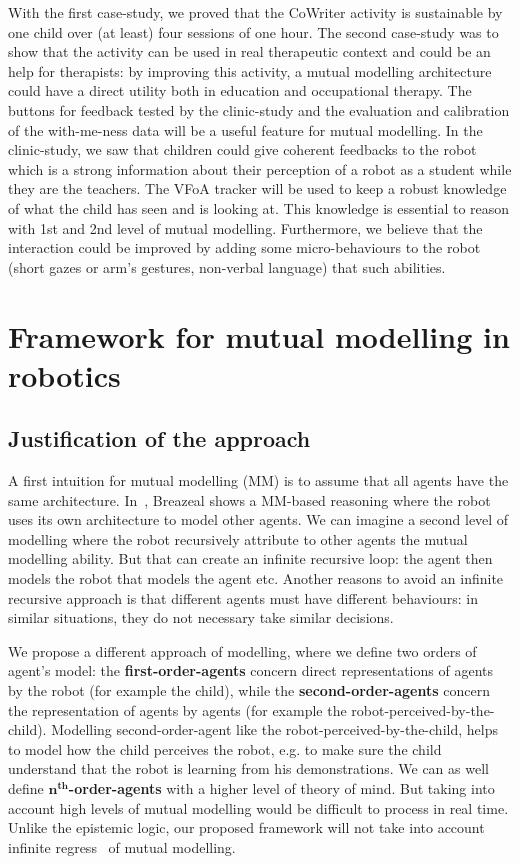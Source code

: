 \documentclass[10pt,a4paper]{article}
\begin{document}
With the first case-study, we proved that the CoWriter activity is sustainable by one child over (at least) four sessions of one hour. 
The second case-study was to show that the activity can be used in real therapeutic context and could be an help for therapists: by improving this activity, a mutual modelling architecture could have a direct utility both in education and occupational therapy. 
The buttons for feedback tested by the clinic-study and the evaluation and calibration of the with-me-ness data will be a useful feature for mutual modelling. 
In the clinic-study, we saw that children could give coherent feedbacks to the robot which is a strong information about their perception of a robot as a student while they are the teachers. 
The VFoA tracker
 will be used to keep a robust knowledge of what the child has seen and is looking at. This knowledge is essential to reason with 1st and 2nd level of mutual modelling. Furthermore, we believe that the interaction could be improved by adding some micro-behaviours to the robot (short gazes or arm's gestures, non-verbal language) that such abilities.

\section{Framework for mutual modelling in robotics}\label{framework}
\subsection{Justification of the approach}

A first intuition for mutual modelling (MM) is to assume that all agents have the same architecture. In~\cite{breazeal2006using}, Breazeal shows a MM-based reasoning where the robot uses its own architecture to model other agents. We can imagine a second level of modelling where the robot recursively attribute to other agents the mutual modelling ability. But that can create an infinite recursive loop: the agent then models the robot that models the agent etc. Another reasons to avoid an infinite recursive approach is that different agents must have different behaviours: in similar situations, they do not necessary take similar decisions. 

We propose a different approach of modelling, where we define two orders of agent's model: the \textbf{first-order-agents} concern direct representations of agents by the robot (for example the child), while the \textbf{second-order-agents} concern the representation of agents by agents (for example the robot-perceived-by-the-child). 
Modelling second-order-agent like the robot-perceived-by-the-child, helps to model how the child perceives the robot, e.g. to make sure the child understand that the robot is learning from his demonstrations. 
We can as well define $\textbf{n}^{\textbf{th}}$\textbf{-order-agents} with a higher level of theory of mind. But taking into account high levels of mutual modelling would be difficult to process in real time. Unlike the epistemic logic, our proposed framework will not take into account infinite regress~\cite{clark1991grounding} of mutual modelling.
\end{document}
